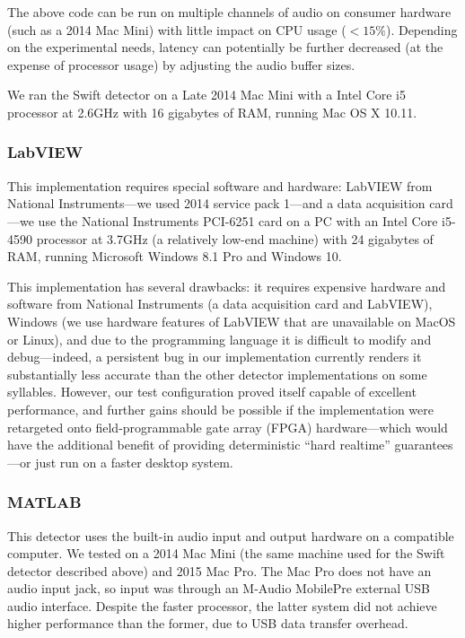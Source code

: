 \documentclass[10pt,letterpaper]{article}
\begin{document}
The above code can be run on multiple channels of audio on consumer
hardware (such as a 2014 Mac Mini) with little impact on CPU usage
($<15\%$). Depending on the experimental needs, latency can potentially
be further decreased (at the expense of processor usage) by adjusting the audio
buffer sizes.

We ran the Swift detector on a Late 2014 Mac Mini with a Intel Core i5
processor at 2.6GHz  with 16 gigabytes of RAM, running Mac OS X 10.11.

\subsubsection{LabVIEW}

This implementation requires special software and hardware: LabVIEW
from National Instruments---we used 2014 service pack 1---and a data acquisition card---we use the
National Instruments PCI-6251 card on a PC with an Intel Core i5-4590
processor at 3.7GHz (a relatively low-end machine) with 24 gigabytes
of RAM, running Microsoft Windows 8.1 Pro and Windows 10.

This implementation has several drawbacks: it requires expensive hardware and software from National Instruments (a data acquisition card and LabVIEW), Windows (we use hardware features of LabVIEW that are unavailable on MacOS or Linux), and due to the programming language it
is difficult to modify and debug---indeed, a persistent bug in our
implementation currently renders it substantially less accurate than
the other detector implementations on some syllables. However, our
test configuration proved itself capable of excellent performance, and further
gains should be possible if the implementation were retargeted onto
field-programmable gate array (FPGA) hardware---which would have the additional benefit of providing
deterministic ``hard realtime'' guarantees---or just run on a faster
desktop system.

\subsubsection{MATLAB}

This detector uses the built-in audio input and output hardware on a
compatible computer.  We tested on a 2014 Mac Mini (the same machine used
for the Swift detector described above) and 2015 Mac Pro.
The Mac Pro does not have an audio input jack, so input was through an
M-Audio MobilePre external USB audio interface.  Despite the faster
processor, the latter system did not achieve higher performance than
the former, due to USB data transfer overhead.
\end{document}
